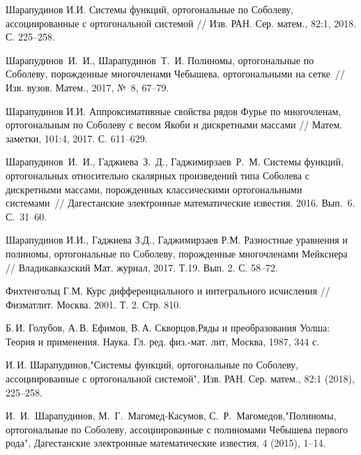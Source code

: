 \begin{thebibliography}{20}
{Шарапудинов И.И.} Системы функций, ортогональные по Соболеву, ассоциированные с ортогональной системой // Изв. РАН. Сер. матем., 82:1, 2018. С. 225--258.



{Шарапудинов~И.~И., Шарапудинов~Т.~И.} Полиномы, ортогональные по Соболеву, порожденные многочленами Чебышева, ортогональными на сетке~// Изв. вузов. Матем., 2017, №~8, 67--79.




{Шарапудинов И.И.} Аппроксимативные свойства рядов Фурье по многочленам, ортогональным по Соболеву с весом Якоби и дискретными массами // Матем. заметки, 101:4, 2017. С. 611--629.



{Шарапудинов~И.~И., Гаджиева~З.~Д., Гаджимирзаев~Р.~М.} Системы функций, ортогональных относительно скалярных произведений типа Соболева с дискретными массами, порожденных классическими ортогональными системами~// Дагестанские электронные математические известия. 2016. Вып.~6. С.~31--60.




{Шарапудинов И.И., Гаджиева З.Д., Гаджимирзаев Р.М.}
Разностные уравнения и полиномы, ортогональные по Соболеву, порожденные многочленами Мейкснера //
Владикавказский Мат. журнал, 2017. Т.19. Вып. 2. С. 58--72.




{Фихтенгольц Г.М.}
Курс дифференциального и интегрального исчисления // Физматлит. Москва. 2001. Т. 2. Стр. 810.




Б.\,И. Голубов, А.\,В. Ефимов, В.\,А. Скворцов,Ряды и преобразования Уолша: Теория и применения. Наука. Гл. ред. физ.-мат. лит, Москва, 1987, 344 с.



И.\,И. Шарапудинов,"Системы функций, ортогональные по Соболеву, ассоциированные с ортогональной системой", Изв. РАН. Сер. матем., 82:1 (2018), 225--258.



И.~И.~Шарапудинов, М.~Г.~Магомед-Касумов, С.~Р.~Магомедов,"Полиномы, ортогональные по Соболеву, ассоциированные с полиномами Чебышева первого рода", Дагестанские электронные математические известия, 4 (2015), 1--14.




\end{thebibliography}
